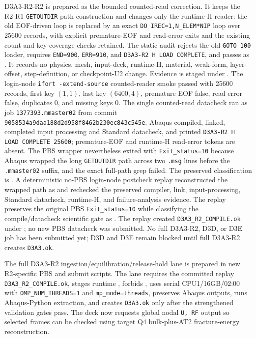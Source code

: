 \documentclass[11pt,a4paper]{article}
\begin{document}
D3A3-R2-R2 is prepared as the bounded counted-read correction. It keeps the
R2-R1 \texttt{GETOUTDIR} path construction and changes only the runtime-H
reader: the old EOF-driven loop is replaced by an exact
\texttt{DO IREC=1,N\_ELEM*NIP} loop over 25600 records, with explicit
premature-EOF and read-error exits and the existing count and key-coverage
checks retained. The static audit rejects the old \texttt{GOTO 100} loader,
requires \texttt{END=900}, \texttt{ERR=910}, and
\texttt{D3A3-R2 H LOAD COMPLETE}, and passes as
. It records no physics, mesh,
input-deck, runtime-H, material, weak-form, layer-offset, step-definition, or
checkpoint-U2 change. Evidence is staged under
.
The login-node \texttt{ifort -extend-source} counted-reader smoke passed with
25600 records, first key $(1,1)$, last key $(6400,4)$, premature EOF false,
read error false, duplicates 0, and missing keys 0.
The single counted-read datacheck ran as job \texttt{1377393.mmaster02} from
commit \texttt{9058534a9daa188d2d958f8462b230ec843c545e}. Abaqus compiled,
linked, completed input processing and Standard datacheck, and printed
\texttt{D3A3-R2 H LOAD COMPLETE 25600}; premature-EOF and runtime-H read-error
tokens are absent. The PBS wrapper nevertheless exited with
\texttt{Exit\_status=10} because Abaqus wrapped the long \texttt{GETOUTDIR}
path across two \texttt{.msg} lines before the \texttt{.mmaster02} suffix, and
the exact full-path grep failed. The preserved classification is
.
A deterministic no-PBS login-node postcheck replay reconstructed the wrapped
path as
and rechecked the preserved compiler, link, input-processing, Standard
datacheck, runtime-H, and failure-analysis evidence. The replay preserves the
original PBS \texttt{Exit\_status=10} while classifying the compile/datacheck
scientific gate as
. The replay
created \texttt{D3A3\_R2\_COMPILE.ok} under
;
no new PBS datacheck was submitted. No full D3A3-R2, D3D, or D3E job has been
submitted yet; D3D and D3E remain blocked until full D3A3-R2 creates
\texttt{D3A3.ok}.

The full D3A3-R2 ingestion/equilibration/release-hold lane is prepared in new
R2-specific PBS and submit scripts. The lane requires the committed replay
\texttt{D3A3\_R2\_COMPILE.ok}, stages runtime ,
forbids , uses serial CPU1/16GB/02:00 with
\texttt{OMP\_NUM\_THREADS=1} and \texttt{mp\_mode=threads}, preserves Abaqus
outputs, runs Abaqus-Python extraction, and creates \texttt{D3A3.ok} only after
the strengthened validation gates pass. The deck now requests global nodal
\texttt{U, RF} output so selected frames can be checked using target Q4
bulk-plus-AT2 fracture-energy reconstruction.
\end{document}
